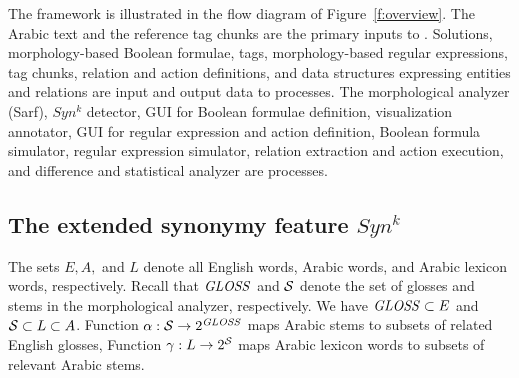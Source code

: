 

The \framework framework is illustrated in the flow diagram of
Figure~\ref{f:overview}.
The Arabic text and the reference tag chunks are the primary inputs to \framework. 
Solutions, morphology-based Boolean formulae, tags, 
morphology-based regular expressions, 
tag chunks, relation and action definitions, and data structures expressing entities 
and relations are input and output data to processes. 
The morphological analyzer (Sarf), $Syn^k$ detector, 
GUI for Boolean formulae definition, 
visualization annotator, GUI for regular expression and action definition, 
Boolean formula simulator, regular expression simulator, 
relation extraction and action execution, and difference and statistical analyzer 
are processes.


\subsection{The extended synonymy feature $Syn^k$}
\label{sec:synk} 

The sets $E, A,$ and $L$ denote all English words, Arabic words, 
and Arabic lexicon words, respectively.
Recall that $\mathit{GLOSS}$ and $\ss$ denote the set of glosses and stems in the morphological analyzer, respectively.
We have $\mathit{GLOSS} \subset E$ and $\ss \subset L \subset A$. 
Function $\alpha: \ss \rightarrow 2^{\GG}$ maps Arabic stems to 
subsets of related English glosses, %
Function $\gamma: L \rightarrow 2^{\ss}$ maps Arabic lexicon words to subsets 
of relevant Arabic stems. %

